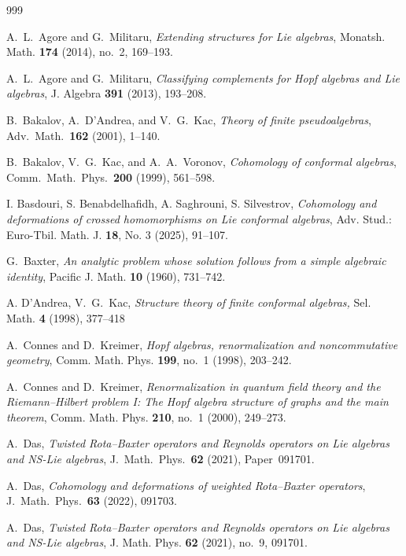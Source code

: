 \documentclass[a4paper,11pt]{article}
\numberwithin{equation}{section}
\begin{document}
\begin{thebibliography}{999}

A.~L.~Agore and G.~Militaru,
\textit{Extending structures for Lie algebras},
Monatsh. Math. \textbf{174} (2014), no.~2, 169--193.

A.~L.~Agore and G.~Militaru,
\textit{Classifying complements for Hopf algebras and Lie algebras},
 J. Algebra  \textbf{391} (2013), 193--208.
 
B.~Bakalov, A.~D'Andrea, and V.~G.~Kac,
\emph{Theory of finite pseudoalgebras},
Adv.\ Math.\ \textbf{162} (2001), 1--140.

B.~Bakalov, V.~G.~Kac, and A.~A.~Voronov,
\emph{Cohomology of conformal algebras},
Comm.\ Math.\ Phys.\ \textbf{200} (1999), 561--598.

 I. Basdouri, S. Benabdelhafidh, A. Saghrouni, S. Silvestrov, 
\emph{Cohomology and deformations of crossed homomorphisms on Lie conformal algebras}, 
Adv. Stud.: Euro-Tbil. Math. J. \textbf{18}, No. 3 (2025), 91--107.

G.~Baxter,
\textit{An analytic problem whose solution follows from a simple algebraic
identity},
Pacific J. Math. \textbf{10} (1960), 731--742.

 A. D'Andrea, V.~G.~Kac, \textit{Structure theory of finite conformal algebras,} Sel. Math. \textbf{4} (1998), 377--418

A.~Connes and D.~Kreimer,
\textit{Hopf algebras, renormalization and noncommutative geometry},
Comm. Math. Phys. \textbf{199}, no.~1 (1998), 203--242.

A.~Connes and D.~Kreimer,
\textit{Renormalization in quantum field theory and the Riemann--Hilbert problem
I: The Hopf algebra structure of graphs and the main theorem},
Comm. Math. Phys. \textbf{210}, no.~1 (2000), 249--273.

A.~Das,
\emph{Twisted Rota--Baxter operators and Reynolds operators on Lie
algebras and NS-Lie algebras},
J.\ Math.\ Phys.\ \textbf{62} (2021), Paper~091701.

A.~Das,
\emph{Cohomology and deformations of weighted Rota--Baxter operators},
J.\ Math.\ Phys.\ \textbf{63} (2022), 091703.

A.~Das,
\textit{Twisted Rota--Baxter operators and Reynolds operators on Lie algebras
and NS-Lie algebras},
J. Math. Phys. \textbf{62} (2021), no.~9, 091701.


\end{thebibliography}
\end{document}
